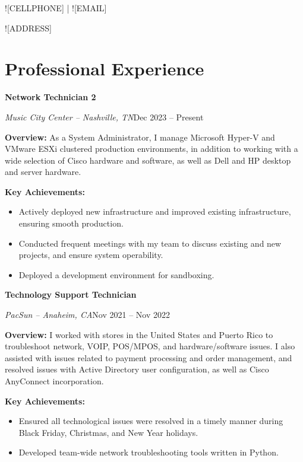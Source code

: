 \documentclass[a4paper]{article}
\renewcommand{\maketitle}{
    \begin{center}
        \color{white}
        {\huge\bfseries\theauthor}
        \vspace{.5em}

        \textsf{![CELLPHONE] | ![EMAIL]}\par
        \textsf{![ADDRESS]}

    \end{center}
}
\begin{document}
%

\author{\textsf{![FIRSTNAME] ![LASTNAME]}}
\maketitle

\section{Professional Experience}
\begin{minipage}{\textwidth}
\textbf{Network Technician 2}\par
\textit{Music City Center -- Nashville, TN}\hfill Dec 2023 -- Present

\medskip
\textbf{Overview:} As a System Administrator, I manage Microsoft Hyper-V and VMware ESXi clustered production environments, in addition to working with a wide selection of Cisco hardware and software, as well as Dell and HP desktop and server hardware.

\medskip
\textbf{Key Achievements:} 
\begin{itemize}
    \item Actively deployed new infrastructure and improved existing infrastructure, ensuring smooth production.
    \item Conducted frequent meetings with my team to discuss existing and new projects, and ensure system operability.
    \item Deployed a development environment for sandboxing.
\end{itemize}
\end{minipage}

\vspace{10pt}
\begin{minipage}{\textwidth}
\textbf{Technology Support Technician}\par
\textit{PacSun -- Anaheim, CA}\hfill Nov 2021 -- Nov 2022

\medskip
\textbf{Overview:} I worked with stores in the United States and Puerto Rico to troubleshoot network, VOIP, POS/MPOS, and hardware/software issues. I also assisted with issues related to payment processing and order management, and resolved issues with Active Directory user configuration, as well as Cisco AnyConnect incorporation.

\medskip
\textbf{Key Achievements:}
\begin{itemize}
    \item Ensured all technological issues were resolved in a timely manner during Black Friday, Christmas, and New Year holidays.
    \item Developed team-wide network troubleshooting tools written in Python.
\end{itemize}
\end{minipage}
\end{document}
